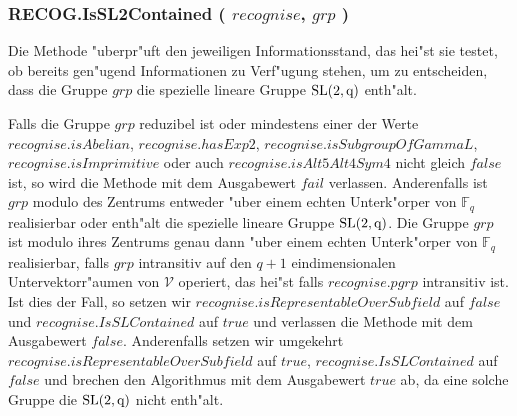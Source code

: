 \documentclass[a4paper,11pt]{article}
\theoremstyle{bla}
\begin{document}

\subsubsection{RECOG.IsSL2Contained ( $recognise$, $grp$ )}\label{sl}

 Die Methode "uberpr"uft den jeweiligen Informationsstand, das hei"st sie testet, ob bereits gen"ugend Informationen zu Verf"ugung stehen, um zu entscheiden, dass die Gruppe $grp$ die spezielle lineare Gruppe $\rm{SL}(2,q)$ enth"alt.

 Falls die Gruppe $grp$ reduzibel ist oder mindestens einer der Werte $recognise.isAbelian$, $recognise.hasExp2$, $recognise.isSubgroupOfGammaL$, $recognise.isImprimitive$ oder auch $recognise.isAlt5Alt4Sym4$ nicht gleich $false$ ist, so wird die Methode mit dem Ausgabewert $fail$ verlassen. Anderenfalls ist $grp$ modulo des Zentrums entweder "uber einem echten Unterk"orper von $\mathbb{F}_{q}$ realisierbar oder enth"alt die spezielle lineare Gruppe $\rm{SL}(2,q)$.
 Die Gruppe $grp$ ist modulo ihres Zentrums genau dann "uber einem echten Unterk"orper von $\mathbb{F}_q$ realisierbar, falls $grp$ intransitiv auf den $q+1$ eindimensionalen Untervektorr"aumen von $\mathcal{V}$ operiert, das hei"st falls $recognise.pgrp$ intransitiv ist. Ist dies der Fall, so setzen wir $recognise.isRepresentableOverSubfield$ auf $false$ und $recognise.IsSLContained$ auf $true$ und verlassen die Methode mit dem Ausgabewert $false$.
 Anderenfalls setzen wir umgekehrt $recognise.isRepresentableOverSubfield$ auf $true$, $recognise.IsSLContained$ auf $false$ und brechen den Algorithmus mit dem Ausgabewert $true$ ab, da eine solche Gruppe die $\rm{SL}(2,q)$ nicht enth"alt.
\end{document}
